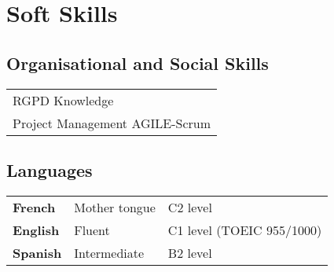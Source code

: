 \documentclass[9pt]{article}
\begin{document}
    \section*{Soft Skills}
    \begin{minipage}[ht]{0.48\textwidth}
        \subsection*{Organisational and Social Skills}
        \begin{tabular}{l}
            RGPD Knowledge\\
            Project Management AGILE-Scrum\\
        \end{tabular}
    \end{minipage}
    \begin{minipage}[ht]{0.48\textwidth}
        \subsection*{Languages}
        \begin{tabular}{lll}
            \bf French&Mother tongue&C2 level\\
            \bf English& Fluent&C1 level (TOEIC 955/1000)\\
            \bf Spanish& Intermediate&B2 level\\
        \end{tabular}
    \end{minipage}
\end{document}
